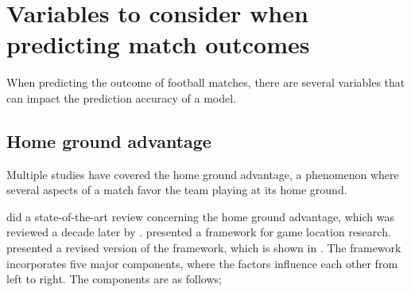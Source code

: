 \section{Variables to consider when predicting match outcomes}

When predicting the outcome of football matches, there are several variables that can impact the prediction accuracy of a model.

\subsection{Home ground advantage}

Multiple studies have covered the home ground advantage, a phenomenon where several aspects of a match favor the team playing at its home ground.

\citet{bib:courneya-carron-1992} did a state-of-the-art review concerning the home ground advantage, which was reviewed a decade later by \citet{bib:carron-loughead-bray-2005}. \citet{bib:courneya-carron-1992} presented a framework for game location research. \citet{bib:carron-loughead-bray-2005} presented a revised version of the framework, which is shown in . The framework incorporates five major components, where the factors influence each other from left to right. The components are as follows;
